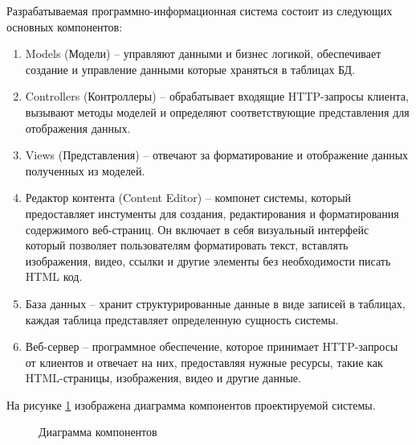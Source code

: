 Разрабатываемая программно-информационная система состоит из следующих основных компонентов:
\begin{enumerate}
	\item Models (Модели) -- управляют данными и бизнес логикой, обеспечивает создание и управление данными которые храняться в таблицах БД.
	\item Controllers (Контроллеры) -- обрабатывает входящие HTTP-запросы клиента, вызывают методы моделей и определяют соответствующие представления для отображения данных.
	\item Views (Представления) -- отвечают за форматирование и отображение данных полученных из моделей.
	\item Редактор контента (Content Editor) -- компонет системы, который предоставляет инстументы для создания, редактирования и форматирования содержимого веб-страниц. Он включает в себя визуальный интерфейс который позволяет пользователям форматировать текст, вставлять изображения, видео, ссылки и другие элементы без необходимости писать HTML код.
	\item База данных -- хранит структурированные данные в виде записей в таблицах, каждая таблица представляет определенную сущность системы.
	\item Веб-сервер -- программное обеспечение, которое принимает HTTP-запросы от клиентов и отвечает на них, предоставляя нужные ресурсы, такие как HTML-страницы, изображения, видео и другие данные.
\end{enumerate}

На рисунке \ref{comp:image} изображена диаграмма компонентов проектируемой системы.

\begin{figure}[H]
	\caption{Диаграмма компонентов}
	\label{comp:image}
\end{figure}

